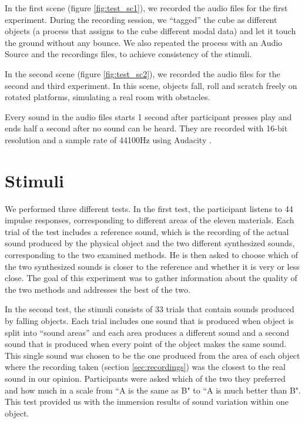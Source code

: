 In the first scene (figure \ref{fig:test_sc1}), we recorded the audio files for the first experiment. During the recording session, we ``tagged'' the cube as different objects (a process that assigns to the cube different modal data) and let it touch the ground without any bounce. We also repeated the process with an Audio Source and the recordings files, to achieve consistency of the stimuli.

In the second scene (figure \ref{fig:test_sc2}), we recorded the audio files for the second and third experiment. In this scene, objects fall, roll and scratch freely on rotated platforms, simulating a real room with obstacles.

Every sound in the audio files starts 1 second after participant presses play and ends half a second after no sound can be heard. They are recorded with 16-bit resolution and a sample rate of 44100Hz using Audacity\textsuperscript{\textregistered} \cite{bib:audacity}.

\section{Stimuli}
We performed three different tests. In the first test, the participant listens to 44 impulse responses, corresponding to different areas of the eleven materials. Each trial of the test includes a reference sound, which is the recording of the actual sound produced by the physical object and the two different synthesized sounds, corresponding to the two examined methods. He is then asked to choose which of the two synthesized sounds is closer to the reference and whether it is very or less close. The goal of this experiment was to gather information about the quality of the two methods and addresses the best of the two.

In the second test, the stimuli consists of 33 trials that contain sounds produced by falling objects. Each trial includes one sound that is produced when object is split into ``sound areas'' and each area produces a different sound and a second sound that is produced when every point of the object makes the same sound. This single sound was chosen to be the one produced from the area of each object where the recording taken (section \ref{sec:recordings}) was the closest to the real sound in our opinion. Participants were asked which of the two they preferred and how much in a scale from ``A is the same as B" to ``A is much better than B". This test provided us with the immersion results of sound variation within one object.

